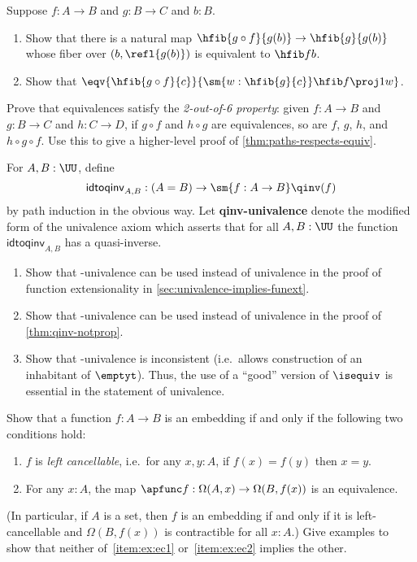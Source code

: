 \begin{ex}\label{ex:unstable-octahedron}
  Suppose $f:A\to B$ and $g:B\to C$ and $b:B$.
  \begin{enumerate}
  \item Show that there is a natural map $\hfib{g\circ f}{g(b)} \to \hfib{g}{g(b)}$ whose fiber over $(b,\refl{g(b)})$ is equivalent to $\hfib f b$.
  \item Show that $\eqv{\hfib{g\circ f}{c}}{\sm{w:\hfib{g}{c}} \hfib f {\proj1 w}}$.
  \end{enumerate}
\end{ex}

\begin{ex}\label{ex:2-out-of-6}
  Prove that equivalences satisfy the \emph{2-out-of-6 property}: given $f:A\to B$ and $g:B\to C$ and $h:C\to D$, if $g\circ f$ and $h\circ g$ are equivalences, so are $f$, $g$, $h$, and $h\circ g\circ f$.
  Use this to give a higher-level proof of \cref{thm:paths-respects-equiv}.
\end{ex}

\begin{ex}\label{ex:qinv-univalence}
  For $A,B:\UU$, define
  \[ \mathsf{idtoqinv}_{A,B} :(A=B) \to \sm{f:A\to B}\qinv(f) \]
  by path induction in the obvious way.
  Let \textbf{\textsf{qinv}-univalence} denote the modified form of the univalence axiom which asserts that for all $A,B:\UU$ the function $\mathsf{idtoqinv}_{A,B}$ has a quasi-inverse.
  \begin{enumerate}
  \item Show that \qinv-univalence can be used instead of univalence in the proof of function extensionality in \cref{sec:univalence-implies-funext}.
  \item Show that \qinv-univalence can be used instead of univalence in the proof of \cref{thm:qinv-notprop}.
  \item Show that \qinv-univalence is inconsistent (i.e.\ allows construction of an inhabitant of $\emptyt$).
    Thus, the use of a ``good'' version of $\isequiv$ is essential in the statement of univalence.
  \end{enumerate}
\end{ex}

\begin{ex}\label{ex:embedding-cancellable}
  Show that a function $f:A\to B$ is an embedding if and only if the following two conditions hold:
  \begin{enumerate}
  \item $f$ is \emph{left cancellable}, i.e.\ for any $x,y:A$, if $f(x)=f(y)$ then $x=y$.\label{item:ex:ec1}
  \item For any $x:A$, the map $\apfunc f: \Omega(A,x) \to \Omega(B,f(x))$ is an equivalence.\label{item:ex:ec2}
  \end{enumerate}
  (In particular, if $A$ is a set, then $f$ is an embedding if and only if it is left-cancellable and $\Omega(B,f(x))$ is contractible for all $x:A$.)
  Give examples to show that neither of~\ref{item:ex:ec1} or~\ref{item:ex:ec2} implies the other.
\end{ex}

